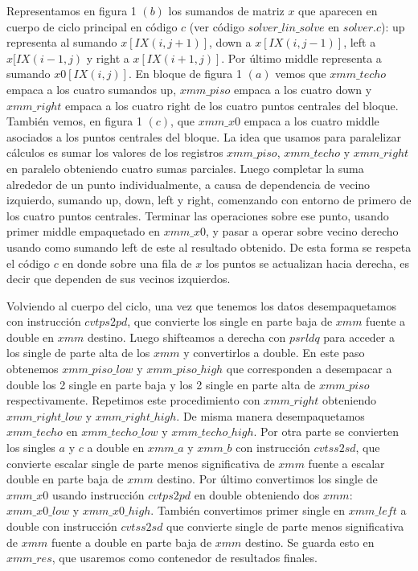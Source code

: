 \par Representamos en figura 1 $(b)$ los sumandos de matriz $x$ que aparecen en cuerpo de ciclo principal en código $c$ (ver código $solver\_lin\_solve$ en $solver.c$): up representa al sumando $x[IX(i,j+1)]$, down a $x[IX(i,j-1)]$, left a $x[IX(i-1,j)$ y right a $x[IX(i+1,j)]$. Por último middle representa a sumando $x0[IX(i,j)]$. En bloque de figura 1 $(a)$ vemos que $xmm\_techo$ empaca a los cuatro sumandos up, $xmm\_piso$ empaca a los cuatro down y $xmm\_right$ empaca a los cuatro right de los cuatro puntos centrales del bloque. También vemos, en figura 1 $(c)$, que $xmm\_x0$ empaca a los cuatro middle asociados a los puntos centrales del bloque. La idea que usamos para paralelizar cálculos es sumar los valores de los registros $xmm\_piso$, $xmm\_techo$ y $xmm\_right$ en paralelo obteniendo cuatro sumas parciales. Luego completar la suma alrededor de un punto individualmente, a causa de dependencia de vecino izquierdo, sumando up, down, left y right, comenzando con entorno de primero de los cuatro puntos centrales. Terminar las operaciones sobre ese punto, usando primer middle empaquetado en $xmm\_x0$, y pasar a operar sobre vecino derecho usando como sumando left de este al resultado obtenido. De esta forma se respeta el código $c$ en donde sobre una fila de $x$ los puntos se actualizan hacia derecha, es decir que dependen de sus vecinos izquierdos.\newline
  
\par Volviendo al cuerpo del ciclo, una vez que tenemos los datos desempaquetamos con instrucción $cvtps2pd$, que convierte los single en parte baja de $xmm$ fuente a double en $xmm$ destino. Luego shifteamos a derecha con $psrldq$ para acceder a los single de parte alta de los $xmm$ y convertirlos a double. En este paso obtenemos $xmm\_piso\_low$ y $xmm\_piso\_high$ que corresponden a desempacar a double los 2 single en parte baja y los 2 single en parte alta de $xmm\_piso$ respectivamente. Repetimos este procedimiento con $xmm\_right$ obteniendo $xmm\_right\_low$ y $xmm\_right\_high$. De misma manera desempaquetamos $xmm\_techo$ en $xmm\_techo\_low$ y $xmm\_techo\_high$. Por otra parte se convierten los singles $a$ y $c$ a double en $xmm\_a$ y $xmm\_b$ con instrucción $cvtss2sd$, que convierte escalar single de parte menos significativa de $xmm$ fuente a escalar double en parte baja de $xmm$ destino. Por último convertimos los single de $xmm\_x0$ usando instrucción $cvtps2pd$ en double obteniendo dos $xmm$: $xmm\_x0\_low$ y $xmm\_x0\_high$. También convertimos primer single en $xmm\_left$ a double con instrucción $cvtss2sd$ que convierte single de parte menos significativa de $xmm$ fuente a double en parte baja de $xmm$ destino. Se guarda esto en $xmm\_res$, que usaremos como contenedor de resultados finales.\newline


